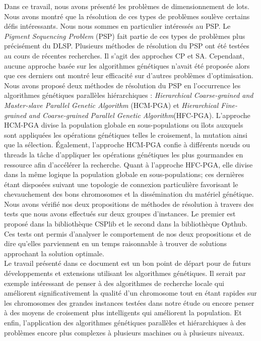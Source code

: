 
Dans ce travail, nous avons présenté	les problèmes de dimensionnement de lots. Nous avons montré que la résolution de ces types de problèmes soulève certains défis intéressants. Nous nous sommes en particulier intéressés au PSP. Le \emph{Pigment Sequencing Problem} (PSP) fait partie de ces types de problèmes plus précisément du DLSP. Plusieurs méthodes de résolution du PSP ont été testées au cours de récentes recherches. Il s'agit des approches CP et SA. Cependant, aucune approche basée sur les algorithmes génétiques n'avait été proposée alors que ces derniers ont montré leur efficacité sur d'autres problèmes d'optimisation.\\
	\hspace*{.5cm} Nous avons proposé deux méthodes de résolution du PSP en l’occurrence les algorithmes génétiques parallèles hiérarchiques : \emph{Hierarchical Coarse-grained and Master-slave Parallel Genetic Algorithm} (HCM-PGA) et \emph{Hierarchical Fine-grained and Coarse-grained Parallel Genetic Algorithm}(HFC-PGA). L'approche HCM-PGA divise la population globale en sous-populations ou îlots auxquels sont appliquées les opérations génétiques telles le croisement, la mutation ainsi que la sélection. Également, l'approche HCM-PGA confie à différents nœuds ou threads la tâche d'appliquer les opérations génétiques les plus gourmandes en ressource afin d'accélérer la recherche. Quant à l'approche HFC-PGA, elle divise dans la même logique la population globale en sous-populations; ces dernières étant disposées suivant une topologie de connexion particulière favorisant le chevauchement des bons chromosomes et la dissémination du matériel génétique.\\
	\hspace*{.5cm} Nous avons vérifié nos deux propositions de méthodes de résolution à travers des tests que nous avons effectués sur deux groupes d'instances. Le premier est proposé dans la bibliothèque CSPlib et le second dans la bibliothèque Opthub. Ces tests ont permis d'analyser le comportement de nos deux propositions et de dire qu'elles parviennent en un temps raisonnable à trouver de solutions approchant la solution optimale.\\
	\hspace*{.5cm}Le travail présenté dans ce document est un bon point de départ pour de futurs développements et extensions utilisant les algorithmes génétiques. Il serait par exemple intéressant de penser à des algorithmes de recherche locale qui améliorent significativement la qualité d'un chromosome tout en étant rapides sur les chromosomes des grandes instances testées dans notre étude ou encore penser à des moyens de croisement plus intelligents qui améliorent la population. Et enfin, l'application des algorithmes génétiques parallèles et hiérarchiques à des problèmes encore plus complexes à plusieurs machines ou à plusieurs niveaux. 